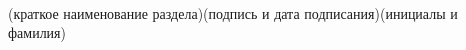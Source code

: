 \begin{titlepage}
\begin{flushleft}
\underline{\hspace{7.5cm}}\hspace{1cm}\underline{\hspace{4cm}}\hspace{1cm}\underline{\hspace{4cm}}\\
\vspace{-.2cm}\hspace{1.5cm}\footnotesize(краткое наименование раздела)\hspace{2cm}(подпись и дата подписания)\hspace{1.1cm}(инициалы и фамилия)\normalsize\\
\end{flushleft}
\thispagestyle{empty}
\end{titlepage}
\setcounter{page}{3}
